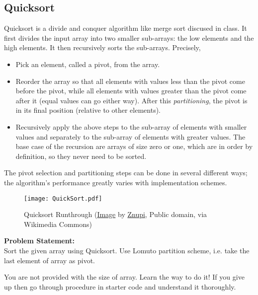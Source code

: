 \documentclass[../../Problems]{subfiles}
\begin{document}
\recalctypearea
\subsection{Quicksort}
Quicksort is a divide and conquer algorithm like merge sort discused in class. It first divides the input array into two smaller sub-arrays: the low elements and the high elements. It then
recursively sorts the sub-arrays. Precisely,
\begin{itemize}
	\item Pick an element, called a pivot, from the array.
	\item Reorder the array so that all elements with values less than the pivot come before the pivot, while all elements with values greater than the pivot come after it (equal values can go either way). After this \emph{partitioning}, the pivot is in its final position (relative to other elements).
	\item Recursively apply the above steps to the sub-array of elements with smaller values and separately to the sub-array of elements with greater values. The base case of the recursion are arrays of size zero or one, which are in order by definition, so they never need to be sorted.
\end{itemize}
\begin{note}
	The pivot selection and partitioning steps can be done in several different ways; the algorithm's performance greatly varies with implementation schemes.
\end{note}
\begin{figure}[H]
	\centering
	\texttt{[image: QuickSort.pdf]}
	\caption{Quicksort Runthrough (\href{https://commons.wikimedia.org/wiki/File:Quicksort-diagram.svg}{Image} by \href{https://commons.wikimedia.org/wiki/User:Znupi}{Znupi}, Public domain, via Wikimedia Commons)}
	\label{fig:quicksort}
\end{figure}
\textbf{Problem Statement:}\\
Sort the given array using Quicksort. Use Lomuto partition scheme, i.e. take the last element of array as pivot.
\begin{note}
	You are not provided with the size of array. Learn the way to do it! If you give up then go through procedure in starter code and understand it thoroughly.
\end{note}
\end{document}
